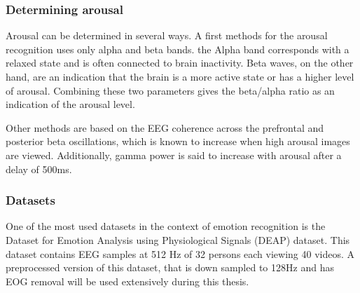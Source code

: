 \subsubsection{Determining arousal}
\label{DetArousal}

Arousal can be determined in several ways. A first methods for the arousal recognition uses only alpha and beta bands. the Alpha band corresponds with a relaxed state and is often connected to brain inactivity\cite{ExtendedPaper,RealTimeEEGEmotion}. Beta waves, on the other hand, are an indication that the brain is a more active state or has a higher level of arousal. Combining these two parameters gives the beta/alpha ratio as an indication of the arousal level. 

\npar

Other methods are based on the EEG coherence across the prefrontal and posterior beta oscillations, which is known to increase when high arousal images are viewed. Additionally, gamma power is said to increase with arousal after a delay of 500ms\cite{GivenPaper}.

\subsubsection{Datasets}
One of the most used datasets in the context of emotion recognition is the Dataset for Emotion Analysis using Physiological Signals (DEAP) dataset\cite{DEAP}. This dataset contains EEG samples at 512 Hz of 32 persons each viewing 40 videos. A preprocessed version of this dataset, that is down sampled to 128Hz and has EOG removal will be used extensively during this thesis.

\npar

